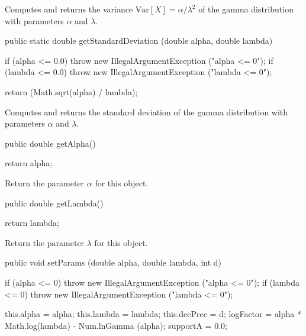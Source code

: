 \begin{tabb}  Computes and returns the variance $\mbox{Var}[X] = \alpha/\lambda^2$
   of the gamma distribution with parameters $\alpha$ and $\lambda$.
\end{tabb}
\begin{htmlonly}
\end{htmlonly}
\begin{code}

   public static double getStandardDeviation (double alpha, double lambda)\begin{hide} {
      if (alpha <= 0.0)
         throw new IllegalArgumentException ("alpha <= 0");
      if (lambda <= 0.0)
         throw new IllegalArgumentException ("lambda <= 0");

      return (Math.sqrt(alpha) / lambda);
   }\end{hide}
\end{code}
\begin{tabb}  Computes and returns the standard deviation of the gamma
   distribution with parameters $\alpha$ and $\lambda$.
\end{tabb}
\begin{htmlonly}
\end{htmlonly}
\begin{code}

   public double getAlpha()\begin{hide} {
      return alpha;
   }\end{hide}
\end{code}
  \begin{tabb} Return the parameter $\alpha$ for this object.
  \end{tabb}
\begin{code}

   public double getLambda()\begin{hide} {
      return lambda;
   }\end{hide}
\end{code}
\begin{tabb} Return the parameter $\lambda$ for this object.
\end{tabb}
\begin{code}

   public void setParams (double alpha, double lambda, int d)\begin{hide} {
      if (alpha <= 0)
         throw new IllegalArgumentException ("alpha <= 0");
      if (lambda <= 0)
         throw new IllegalArgumentException ("lambda <= 0");

      this.alpha   = alpha;
      this.lambda  = lambda;
      this.decPrec = d;
      logFactor    = alpha * Math.log(lambda) - Num.lnGamma (alpha);
      supportA = 0.0;
    } \end{hide}
\end{code}
